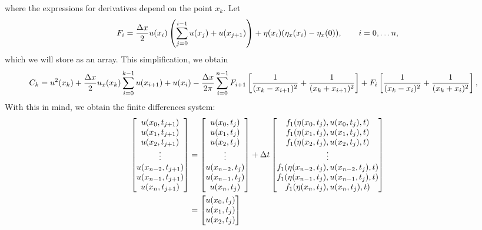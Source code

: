 \documentclass[10pt,reqno,oneside,a4paper, landscape]{article}
\begin{document}
where the expressions for derivatives depend on the point $x_k.$ Let 
\[ 
F_i = \frac{\Delta x}{2}u(x_{i}) \left(\sum^{i-1}_{j=0} u(x_j)+u(x_{j+1}) \right) + \eta(x_{i})(\eta_x(x_{i}) - \eta_x(0)), \qquad i = 0, \ldots n,
\] 
which we will store as an array. This simplification, we obtain 
\begin{align*}
C_k &= u^2(x_k) + \frac{\Delta x}{2}  u_{x}(x_k) \sum^{k-1}_{i=0} u(x_{i+1}) + u(x_i) -\frac{\Delta x}{2\pi} \sum^{n-1}_{i=0} F_{i+1} \left[ \frac{1}{(x_k-x_{i+1})^2} + \frac{1}{(x_k+x_{i+1})^2} \right] + F_{i} \left[ \frac{1}{(x_k-x_{i})^2} + \frac{1}{(x_k+x_{i})^2} \right],
\end{align*}
With this in mind, we obtain the finite differences system:
\begin{align*}
\begin{bmatrix}
u(x_0, t_{j+1}) \\
u(x_1, t_{j+1}) \\
u(x_2, t_{j+1}) \\
\vdots \\
u(x_{n-2}, t_{j+1}) \\
u(x_{n-1}, t_{j+1}) \\
u(x_n, t_{j+1}) 
\end{bmatrix} 
&= 
\begin{bmatrix}
u(x_0, t_{j}) \\
u(x_1, t_{j}) \\
u(x_2, t_{j}) \\
\vdots \\
u(x_{n-2}, t_{j}) \\
u(x_{n-1}, t_{j}) \\
u(x_n, t_{j}) 
\end{bmatrix} 
+ \Delta t 
\begin{bmatrix}
f_1(\eta(x_0, t_j), u(x_0, t_j), t)\\
f_1(\eta(x_1, t_j), u(x_1, t_j), t) \\
 f_1(\eta(x_2, t_j), u(x_2, t_j), t) \\
\vdots \\
f_1(\eta(x_{n-2}, t_j), u(x_{n-2}, t_j), t)\\
f_1(\eta(x_{n-1}, t_j), u(x_{n-1}, t_j), t) \\
f_1(\eta(x_n, t_j), u(x_n, t_j), t) 
\end{bmatrix} \\
&= 
\begin{bmatrix}
u(x_0, t_{j}) \\
u(x_1, t_{j}) \\
u(x_2, t_{j}) \\

\end{bmatrix}
\end{align*}
\end{document}
